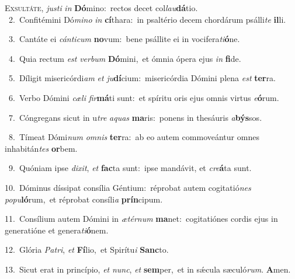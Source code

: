 \lettrine{\initial\textcolor{\initialcolor}{E}}{xsultáte,} \textit{jus}\-\textit{ti} \textit{in} \textbf{Dó}\-mino:~\star rectos decet col\-\textit{lau}\-\textbf{dá}tio.\\
{\numbfont\textcolor{\numbcolor}{~2.}}~Confitémini Dó\-\textit{mi}\-\textit{no} \textit{in} \textbf{cí}\-thara:~\star in psaltério decem chordárum psálli\textit{te} \textbf{il}\-li.\par
{\numbfont\textcolor{\numbcolor}{~3.}}~Cantáte ei \textit{cán}\-\textit{ti}\textit{cum} \textbf{no}\-vum:~\star bene psállite ei in vocifera\-\textit{ti}\-\textbf{ó}ne.\par
{\numbfont\textcolor{\numbcolor}{~4.}}~Quia rectum \textit{est} \textit{ver}\-\textit{bum} \textbf{Dó}\-mini,~\star et ómnia ópera ejus \textit{in} \textbf{fi}\-de.\par
{\numbfont\textcolor{\numbcolor}{~5.}}~Díligit misericórdi\textit{am} \textit{et} \textit{ju}\-\textbf{dí}cium:~\star misericórdia Dómini plena \textit{est} \textbf{ter}\-ra.\par
{\numbfont\textcolor{\numbcolor}{~6.}}~Verbo Dómini \textit{cæ}\-\textit{li} \textit{fir}\-\textbf{má}ti sunt:~\star et spíritu oris ejus omnis virtus \textit{e}\-\textbf{ó}rum.\par
{\numbfont\textcolor{\numbcolor}{~7.}}~Cóngregans sicut in u\textit{tre} \textit{a}\-\textit{quas} \textbf{ma}\-ris:~\star ponens in thesáuris \textit{a}\-\textbf{býs}sos.\par
{\numbfont\textcolor{\numbcolor}{~8.}}~Tímeat Dómi\textit{num} \textit{om}\-\textit{nis} \textbf{ter}\-ra:~\star ab eo autem commoveántur omnes inhabitán\textit{tes} \textbf{or}\-bem.\par
{\numbfont\textcolor{\numbcolor}{~9.}}~Quóniam ipse \textit{di}\-\textit{xit}, \textit{et} \textbf{fac}\-ta sunt:~\star ipse mandávit, et \textit{cre}\-\textbf{á}ta sunt.\par
{\numbfont\textcolor{\numbcolor}{10.}}~Dóminus díssipat consília Géntium:~\dagger réprobat autem cogitatió\textit{nes} \textit{po}\-\textit{pu}\textbf{ló}rum,~\star et réprobat consíli\textit{a} \textbf{prín}\-cipum.\par
{\numbfont\textcolor{\numbcolor}{11.}}~Consílium autem Dómini in \textit{æ}\-\textit{tér}\textit{num} \textbf{ma}\-net:~\star cogitatiónes cordis ejus in generatióne et genera\-\textit{ti}\-\textbf{ó}nem.\par
{\numbfont\textcolor{\numbcolor}{12.}}~Glória \textit{Pa}\-\textit{tri}, \textit{et} \textbf{Fí}\-lio,~\star et Spirítu\textit{i} \textbf{Sanc}\-to.\par
{\numbfont\textcolor{\numbcolor}{13.}}~Sicut erat in princípio, \textit{et} \textit{nunc}\-, \textit{et} \textbf{sem}\-per,~\star et in sǽcula sæculó\-\textit{rum}\-. \textbf{A}\-men.\par
